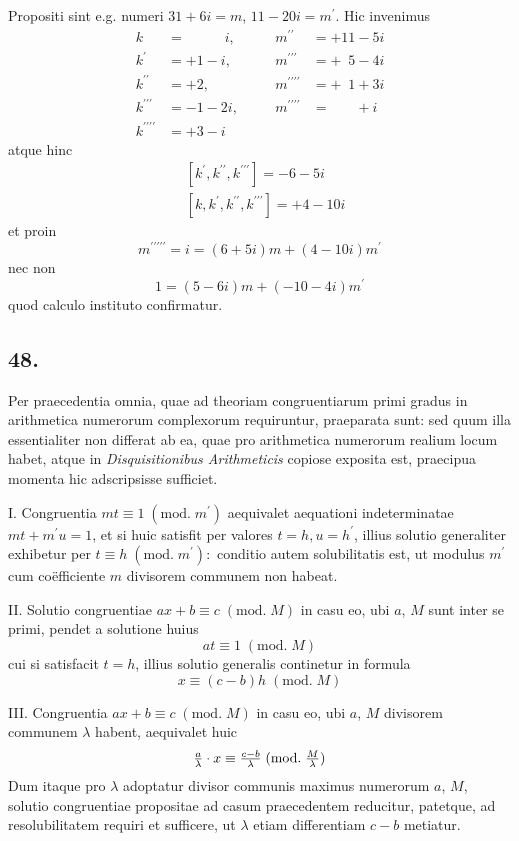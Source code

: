 \documentclass[twoside,12pt]{memoir}
\renewcommand{\pmod}[1]{\;(\textrm{mod.}\;#1)}
\let\oldfrac\frac
\def\frac#1#2{\mathchoice{\tfrac{#1}{#2}}{\oldfrac{#1}{#2}}{\genfrac{}{}{}{2}{#1}{#2\mathstrut}}{\genfrac{}{}{}{3}{#1}{#2\mathstrut}}}
\begin{document}
Propositi sint e.g. numeri \(31+6 i=m\), \(11-20 i=m^{\prime}\). Hic invenimus
\[\begin{array}{clccl}
k&=\phantom{+1-\;} i,&\quad& m^{\prime \prime}&=+11-5 i \\
k^{\prime}&=+1-i, &\quad& m^{\prime \prime \prime}&=+\phantom{0}5-4 i \\
k^{\prime \prime}&=+2, &\quad& m^{\prime \prime \prime \prime}&=+\phantom{0}1+3 i \\
k^{\prime \prime \prime}&=-1-2 i, &\quad& m^{\prime \prime \prime \prime}&=\phantom{+00}+i \\
k^{\prime \prime \prime \prime}&=+3-i &\quad&&
\end{array}\]
atque hinc
\[\begin{aligned}
& {\left[k^{\prime}, k^{\prime \prime}, k^{\prime \prime \prime}\right]=-6-5 i} \\
& {\left[k, k^{\prime}, k^{\prime \prime}, k^{\prime \prime \prime}\right]=+4-10 i}
\end{aligned}\]
et proin
\[m^{\prime \prime \prime \prime \prime}=i=(6+5 i) m+(4-10 i) m^{\prime}\]
nec non
\[1=(5-6 i) m+(-10-4 i) m^{\prime}\]
quod calculo instituto confirmatur.

\subsection*{48.}
 
Per praecedentia omnia, quae ad theoriam congruentiarum primi gradus in arithmetica numerorum complexorum requiruntur, praeparata sunt: sed quum illa\pagebreak%
essentialiter non differat ab ea, quae pro arithmetica numerorum realium locum habet, atque in \textit{Disquisitionibus Arithmeticis} copiose exposita est, praecipua momenta hic adscripsisse sufficiet.
 
I. Congruentia \(m t \equiv 1\pmod{m^{\prime}}\) aequivalet aequationi indeterminatae \(m t+m^{\prime} u=1\), et si huic satisfit per valores \(t=h, u=h^{\prime}\), illius solutio generaliter exhibetur per \(t \equiv h\pmod{m^{\prime}}:\) conditio autem solubilitatis est, ut modulus \(m^{\prime}\) cum coëfficiente \(m\) divisorem communem non habeat.
 
II. Solutio congruentiae \(a x+b \equiv c\pmod{M}\) in casu eo, ubi \(a\), \(M\) sunt inter se primi, pendet a solutione huius
\[a t \equiv 1\pmod{M}\]
cui si satisfacit \(t=h\), illius solutio generalis continetur in formula
\[x \equiv(c-b) h\pmod{M}\]
 
III. Congruentia \(a x+b \equiv c\pmod{M}\) in casu eo, ubi \(a\), \(M\) divisorem communem \(\lambda\) habent, aequivalet huic
\[\frac{a}{\lambda} \cdot x \equiv \frac{c-b}{\lambda}\pmod{\frac{M}{\lambda}}\]
Dum itaque pro \(\lambda\) adoptatur divisor communis maximus numerorum \(a\), \(M\), solutio congruentiae propositae ad casum praecedentem reducitur, patetque, ad resolubilitatem requiri et sufficere, ut \(\lambda\) etiam differentiam \(c-b\) metiatur.
\end{document}
